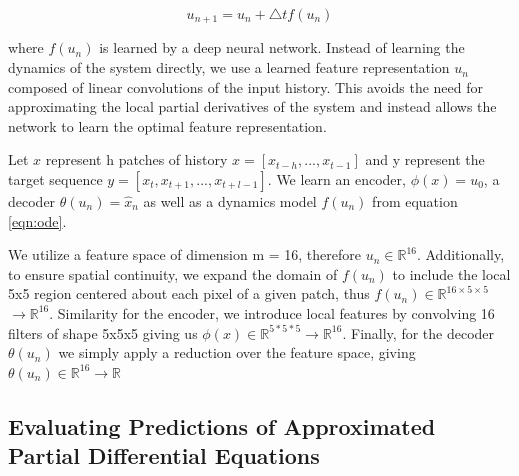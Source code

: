 \documentclass[12pt]{article}
\newcommand{\R}{ \ensuremath{\mathbb{R}}}  %
\theoremstyle{plain}
\theoremstyle{remark}
\theoremstyle{definition}
\begin{document}
    $$u_{n+1} = u_n + \bigtriangleup t f(u_n) \label{eqn:ode} $$

    where $f(u_n)$ is learned by a deep neural network. Instead of learning the dynamics of the system directly, we use a learned feature representation $u_n$ composed of linear convolutions of the input history. This avoids the need for approximating the local partial derivatives of the system and instead allows the network to learn the optimal feature representation.


    Let $x$ represent h patches of history $x = [x_{t-h}, ..., x_{t-1}]$ and y represent the target sequence $y =
    [x_{t}, x_{t+1},...,x_{t+l-1}]$. We learn an encoder, $\phi(x) = u_0$, a decoder $\theta(u_n) = \hat{x}_n$ as well as a dynamics model $f(u_n)$ from equation \ref{eqn:ode}.

    We utilize a feature space of dimension m = 16, therefore $u_n \in \R^{16}$. Additionally, to ensure spatial continuity, we expand the domain of  $f(u_n)$ to include the local 5x5 region centered about each pixel of a given patch, thus $f(u_n) \in \R^{16 \times 5 \times 5}$ $\rightarrow \R^{16}$.
    Similarity for the encoder, we introduce local features by convolving 16 filters of shape 5x5x5 giving us $\phi(x) \in \R^{5*5*5} \rightarrow \R^{16}$. Finally, for the decoder $\theta(u_n)$ we simply apply a reduction over the feature space, giving  $\theta(u_n) \in \R^{16} \rightarrow \R$




    \subsection{Evaluating Predictions of Approximated Partial Differential Equations}
\end{document}
